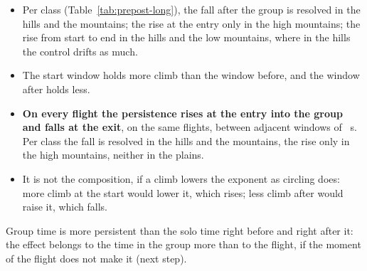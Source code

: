 \documentclass[10pt,a4paper]{article}
\newcommand{\Home}{\item[\textcolor{answer}{\textbf{Take home.}}]\color{black}}
\newcommand{\Ded}{\item[\textcolor{answer}{\textbf{Deduction.}}]\color{black}}
\newenvironment{step}{\begin{description}[leftmargin=0pt, itemsep=7pt, topsep=8pt]}{\end{description}}
\begin{document}
\begin{step}
\begin{itemize}
    to about the level before; the fall is far outside the control.
  \item Per class (Table~\ref{tab:prepost-long}), the fall after the group is resolved in the hills and the
    mountains; the rise at the entry only in the high mountains; the rise from start to end in the hills and the
    low mountains, where in the hills the control drifts as much.
  \item The start window holds more climb than the window before, and the window after holds less.
  \end{itemize}
\Ded\mbox{}
  \begin{itemize}
  \item \textbf{On every flight the persistence rises at the entry into the group and falls at the exit}, on the
    same flights, between adjacent windows of \WhenWindow~s. Per class the fall is resolved in the hills and the
    mountains, the rise only in the high mountains, neither in the plains.
  \item It is not the composition, if a climb lowers the exponent as circling does: more climb at the start would
    lower it, which rises; less climb after would raise it, which falls.
  \end{itemize}
\Home Group time is more persistent than the solo time right before and right after it: the effect belongs to the
  time in the group more than to the flight, if the moment of the flight does not make it (next step).
\end{step}
\end{document}
